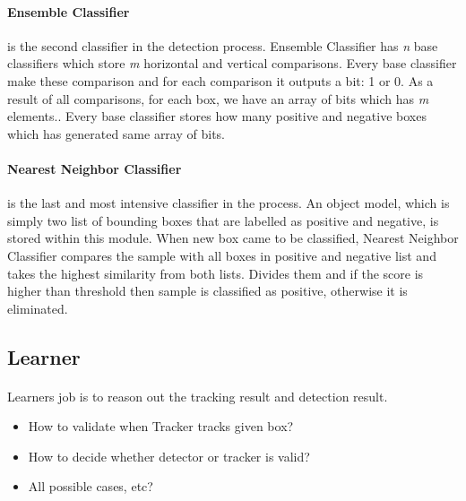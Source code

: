 \documentclass{article}
\begin{document}
                \paragraph{Ensemble Classifier} is the second classifier in the detection process. Ensemble Classifier has
                \emph{n} base classifiers which store \emph{m} horizontal and vertical comparisons.
                Every base classifier make these comparison and for each comparison it outputs a bit: 1 or 0.
                As a result of all comparisons, for each box, we have an array of bits which has \emph{m} elements..
                Every base classifier stores  how many positive and negative boxes which has generated same array of bits.

                \paragraph{Nearest Neighbor Classifier} is the last and most intensive classifier in the process.
                An object model, which is simply two list of bounding boxes that are labelled as positive and negative, is stored
                within this module. When new box came to be classified, Nearest Neighbor Classifier compares the sample with all
                boxes in positive and negative list and takes the highest similarity from both lists. Divides them and if the score
                is higher than threshold then sample is classified as positive, otherwise it is eliminated.
        \subsection{Learner}
            \paragraph{}
                Learners job is to reason out the tracking result and detection result.
                \begin{itemize}
                    \item How to validate when Tracker tracks given box?
                    \item How to decide whether detector or tracker is valid?
                    \item All possible cases, etc?
                \end{itemize}
\end{document}
